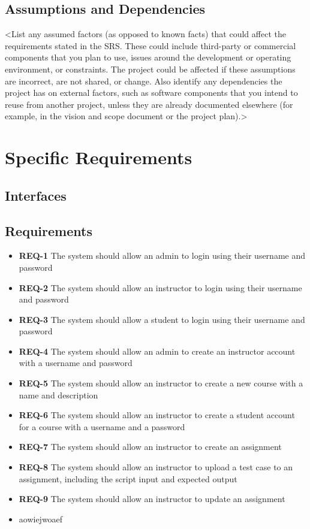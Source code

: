 \documentclass{article}
\begin{document}
\subsection{Assumptions and Dependencies}
<List any assumed factors (as opposed to known facts) that could affect the requirements stated in the SRS. These could include third-party or commercial components that you plan to use, issues around the development or operating environment, or constraints. The project could be affected if these assumptions are incorrect, are not shared, or change. Also identify any dependencies the project has on external factors, such as software components that you intend to reuse from another project, unless they are already documented elsewhere (for example, in the vision and scope document or the project plan).>


\newpage
\section{Specific Requirements}

\subsection{Interfaces}

\subsection{Requirements}

\begin{itemize}
  \item \textbf{REQ-1} The system should allow an admin to login using their username and password
  \item \textbf{REQ-2} The system should allow an instructor to login using their username and password
  \item \textbf{REQ-3} The system should allow a student to login using their username and password
  \item \textbf{REQ-4} The system should allow an admin to create an instructor account with a username and password
  \item \textbf{REQ-5} The system should allow an instructor to create a new course with a name and description
  \item \textbf{REQ-6} The system should allow an instructor to create a student account for a course with a username and a password
  \item \textbf{REQ-7} The system should allow an instructor to create an assignment
  \item \textbf{REQ-8} The system should allow an instructor to upload a test case to an assignment, including the script input and expected output
  \item \textbf{REQ-9} The system should allow an instructor to update an assignment
  \item aowiejwoaef

\end{itemize}
\end{document}
